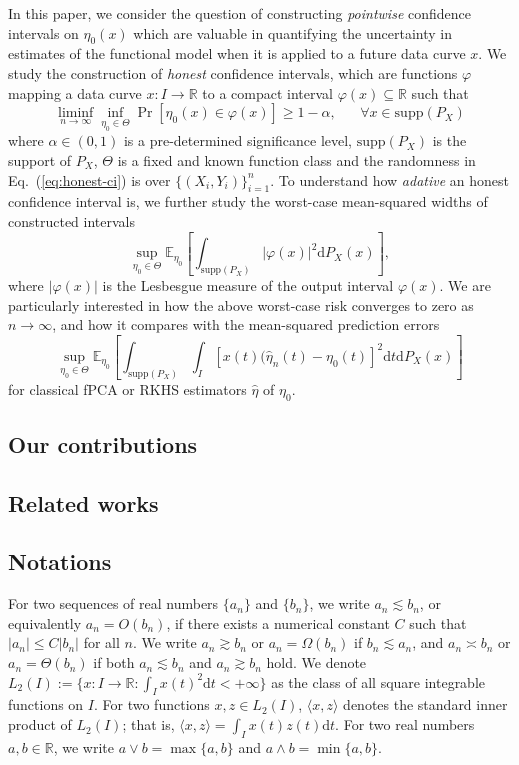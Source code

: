 \documentclass[11pt,a4paper]{article}
\renewcommand{\hat}{\widehat}
\theoremstyle{definition}
\theoremstyle{plain}
\theoremstyle{remark}
\newcommand{\supp}{\mathrm{supp}}
\newcommand{\ud}{\mathrm d}
\begin{document}
In this paper, we consider the question of constructing \emph{pointwise} confidence intervals on $\eta_0(x)$ which are valuable in quantifying the uncertainty in estimates of the functional model
when it is applied to a future data curve $x$. We study the construction of \emph{honest} confidence intervals, which are functions $\varphi$ mapping a data curve $x:I\to\mathbb R$ to a compact interval $\varphi(x)\subseteq\mathbb R$
such that
\begin{equation}
\liminf_{n\to\infty}\inf_{\eta_0\in\Theta} \Pr\left[\eta_0(x)\in\varphi(x)\right] \geq 1-\alpha,\;\;\;\;\;\;\forall x\in\mathrm{supp}(P_X)
\label{eq:honest-ci}
\end{equation}
where $\alpha\in(0,1)$ is a pre-determined significance level,
$\supp(P_X)$ is the support of $P_X$, $\Theta$ is a fixed and known function class and the randomness in Eq.~(\ref{eq:honest-ci}) is over $\{(X_i,Y_i)\}_{i=1}^n$.
To understand how \emph{adative} an honest confidence interval is, we further study the worst-case mean-squared widths of constructed intervals
\begin{equation}
\sup_{\eta_0\in\Theta}\mathbb E_{\eta_0} \left[\int_{\supp(P_X)}\big|\varphi(x)\big|^2\ud P_X(x)\right],
\label{eq:adaptive}
\end{equation}
where $|\varphi(x)|$ is the Lesbesgue measure of the output interval $\varphi(x)$. We are particularly interested in how the above worst-case risk converges to zero as $n\to\infty$,
and how it compares with the mean-squared prediction errors
$$
\sup_{\eta_0\in\Theta}\mathbb E_{\eta_0} \left[\int_{\supp(P_X)}\int_I [x(t)(\hat\eta_n(t)-\eta_0(t)]^2\ud t\ud P_X(x)\right]
$$
for classical fPCA or RKHS estimators $\hat\eta$ of $\eta_0$.

\subsection{Our contributions}

\subsection{Related works}

\subsection{Notations}

For two sequences of real numbers $\{a_n\}$ and $\{b_n\}$, we write $a_n\lesssim b_n$, or equivalently $a_n=O(b_n)$, if there exists a numerical constant $C$ such that $|a_n|\leq C|b_n|$ for all $n$.
We write $a_n\gtrsim b_n$ or $a_n=\Omega(b_n)$ if $b_n\lesssim a_n$, and $a_n\asymp b_n$ or $a_n=\Theta(b_n)$ if both $a_n\lesssim b_n$ and $a_n\gtrsim b_n$ hold.
We denote $L_2(I):=\{x: I\to\mathbb R: \int_I x(t)^2\ud t<+\infty\}$ as the class of all square integrable functions on $I$.
For two functions $x,z\in L_2(I)$, $\langle x,z\rangle$ denotes the standard inner product of $L_2(I)$; that is, $\langle x,z\rangle = \int_I x(t)z(t)\ud t$.
For two real numbers $a,b\in\mathbb R$, we write $a\vee b=\max\{a,b\}$ and $a\wedge b=\min\{a,b\}$.
\end{document}
